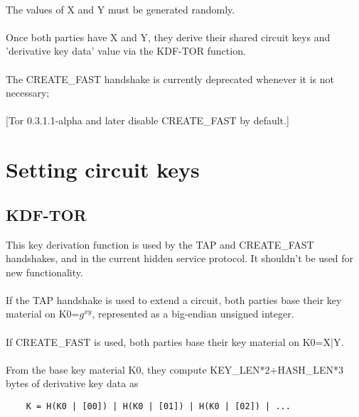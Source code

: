 \paragraph{}
The values of X and Y must be generated randomly.

\paragraph{}
Once both parties have X and Y, they derive their shared circuit keys
and 'derivative key data' value via the KDF-TOR function.

\paragraph{}
The CREATE\_FAST handshake is currently deprecated whenever it is not
necessary;

\paragraph{}
[Tor 0.3.1.1-alpha and later disable CREATE\_FAST by default.]

\section{Setting circuit keys}

\subsection{KDF-TOR}
This key derivation function is used by the TAP and CREATE\_FAST
handshakes, and in the current hidden service protocol. It shouldn't
be used for new functionality.

\paragraph{}
If the TAP handshake is used to extend a circuit, both parties
base their key material on K0=$g^{xy}$, represented as a big-endian unsigned
integer.

\paragraph{}
If CREATE\_FAST is used, both parties base their key material on
K0=X|Y.

\paragraph{}
From the base key material K0, they compute KEY\_LEN*2+HASH\_LEN*3 bytes of
derivative key data as
\begin{verbatim}
    K = H(K0 | [00]) | H(K0 | [01]) | H(K0 | [02]) | ...
\end{verbatim}

